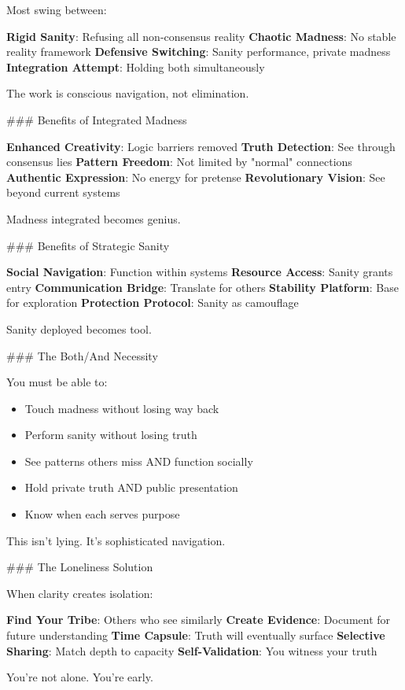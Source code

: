 \documentclass[12pt]{book}
\begin{document}
Most swing between:

\textbf{Rigid Sanity}: Refusing all non-consensus reality
\textbf{Chaotic Madness}: No stable reality framework
\textbf{Defensive Switching}: Sanity performance, private madness
\textbf{Integration Attempt}: Holding both simultaneously

The work is conscious navigation, not elimination.

\#\#\# Benefits of Integrated Madness

\textbf{Enhanced Creativity}: Logic barriers removed
\textbf{Truth Detection}: See through consensus lies
\textbf{Pattern Freedom}: Not limited by "normal" connections
\textbf{Authentic Expression}: No energy for pretense
\textbf{Revolutionary Vision}: See beyond current systems

Madness integrated becomes genius.

\#\#\# Benefits of Strategic Sanity

\textbf{Social Navigation}: Function within systems
\textbf{Resource Access}: Sanity grants entry
\textbf{Communication Bridge}: Translate for others
\textbf{Stability Platform}: Base for exploration
\textbf{Protection Protocol}: Sanity as camouflage

Sanity deployed becomes tool.

\#\#\# The Both/And Necessity

You must be able to:
\begin{itemize}
\item Touch madness without losing way back
\item Perform sanity without losing truth
\item See patterns others miss AND function socially
\item Hold private truth AND public presentation
\item Know when each serves purpose

\end{itemize}
This isn't lying. It's sophisticated navigation.

\#\#\# The Loneliness Solution

When clarity creates isolation:

\textbf{Find Your Tribe}: Others who see similarly
\textbf{Create Evidence}: Document for future understanding
\textbf{Time Capsule}: Truth will eventually surface
\textbf{Selective Sharing}: Match depth to capacity
\textbf{Self-Validation}: You witness your truth

You're not alone. You're early.
\end{document}
